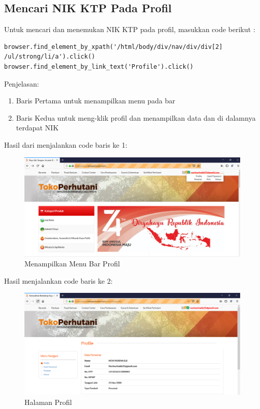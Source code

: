 \newpage
\subsection{Mencari NIK KTP Pada Profil}
Untuk mencari dan menemukan NIK KTP pada profil, masukkan code berikut :
\begin{verbatim}
browser.find_element_by_xpath('/html/body/div/nav/div/div[2]
/ul/strong/li/a').click()
browser.find_element_by_link_text('Profile').click()
\end{verbatim}

Penjelasan:
\begin{enumerate}
	\item Baris Pertama untuk menampilkan menu pada bar
	\item Baris Kedua untuk meng-klik profil dan menampilkan data dan di dalamnya terdapat NIK
\end{enumerate}

Hasil dari menjalankan code baris ke 1:
\begin{figure}[h]
	\centering
	\includegraphics[scale=0.25]{figures/caripropil}
	\caption{Menampilkan Menu Bar Profil}
\end{figure}

Hasil menjalankan code baris ke 2:
\begin{figure}[h]
	\centering
	\includegraphics[scale=0.25]{figures/cari}
	\caption{Halaman Profil}
\end{figure}

